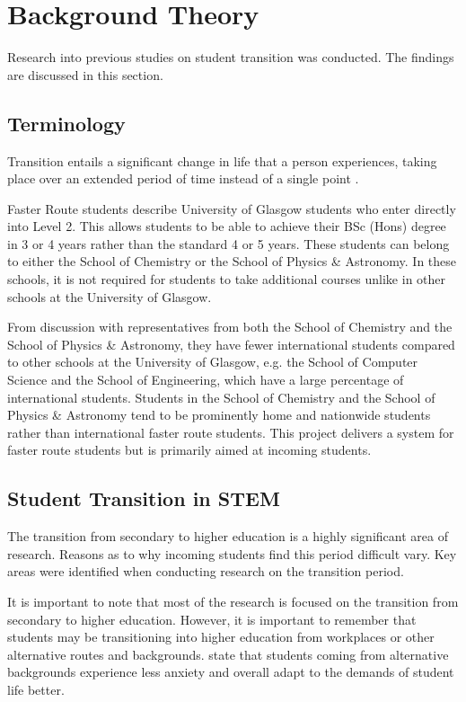 \documentclass{l4proj}
\begin{document}
\section{Background Theory}
Research into previous studies on student transition was conducted. The findings are discussed in this section.

\subsection{Terminology}
Transition entails a significant change in life that a person experiences,  taking place over an extended period of time instead of a single point \citep{thompson2021navigating}.

Faster Route students describe University of Glasgow students who enter directly into Level 2. This allows students to be able to achieve their BSc (Hons) degree in 3 or 4 years rather than the standard 4 or 5 years. These students can belong to either the School of Chemistry or the School of Physics \& Astronomy. In these schools,  it is not required for students to take additional courses unlike in other schools at the University of Glasgow.

From discussion with representatives from both the School of Chemistry and the School of Physics \& Astronomy,  they have fewer international students compared to other schools at the University of Glasgow,  e.g. the School of Computer Science and the School of Engineering,  which have a large percentage of international students. Students in the School of Chemistry and the School of Physics \& Astronomy tend to be prominently home and nationwide students rather than international faster route students. This project delivers a system for faster route students but is primarily aimed at incoming students.

\subsection{Student Transition in STEM}
The transition from secondary to higher education is a highly significant area of research. Reasons as to why incoming students find this period difficult vary. Key areas were identified when conducting research on the transition period.

It is important to note that most of the research is focused on the transition from secondary to higher education. However,  it is important to remember that students may be transitioning into higher education from workplaces or other alternative routes and backgrounds. \citet{shankland2010student} state that students coming from alternative backgrounds experience less anxiety and overall adapt to the demands of student life better.
\end{document}
